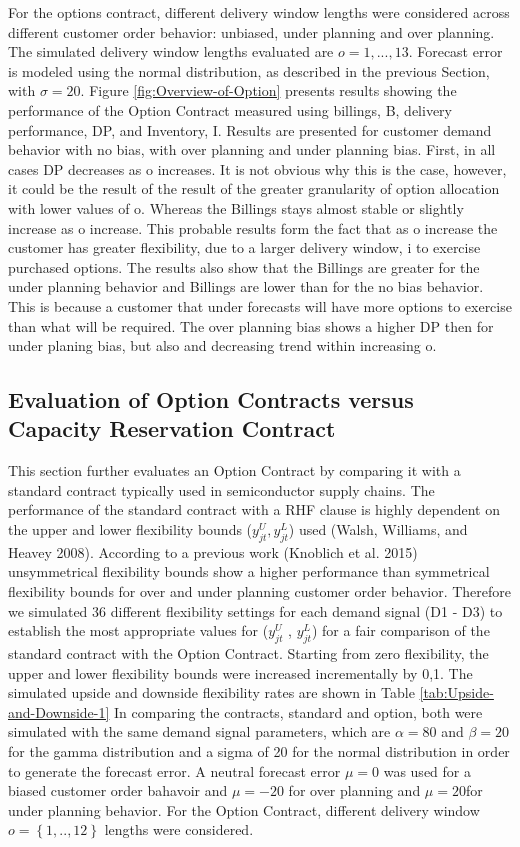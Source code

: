 \documentclass[12pt,english]{article}
\begin{document}
For the options contract, different delivery window
lengths were considered across different customer order behavior:
unbiased, under planning and over planning. The simulated delivery
window lengths evaluated are $o={1,...,13}$. Forecast error is modeled
using the normal distribution, as described in the previous Section,
with $\sigma=20.$ Figure \ref{fig:Overview-of-Option} presents
results showing the performance of the Option Contract measured using
billings, B, delivery performance, DP, and Inventory, I. Results are
presented for customer demand behavior with no bias, with over planning
and under planning bias. First, in all cases DP decreases as o increases.
It is not obvious why this is the case, however, it could be the result
of the result of the greater granularity of option allocation with
lower values of o. Whereas the Billings stays almost stable or slightly
increase as o increase. This probable results form the fact that as
o increase the customer has greater flexibility, due to a larger delivery
window, i to exercise purchased options. The results also show that
the Billings are greater for the under planning behavior and Billings
are lower than for the no bias behavior. This is because a customer
that under forecasts will have more options to exercise than what
will be required. The over planning bias shows a higher DP then for
under planing bias, but also and decreasing trend within increasing
o.

\subsection{Evaluation of Option Contracts versus Capacity
Reservation Contract}

This section further evaluates an Option Contract
by comparing it with a standard contract typically used in semiconductor
supply chains. The performance of the standard contract with a RHF
clause is highly dependent on the upper and lower flexibility bounds
($y_{jt}^{U},y_{jt}^{L}$) used (Walsh, Williams, and Heavey 2008).
According to a previous work (Knoblich et al. 2015) unsymmetrical
flexibility bounds show a higher performance than symmetrical flexibility
bounds for over and under planning customer order behavior. Therefore
we simulated 36 different flexibility settings for each demand signal
(D1 - D3) to establish the most appropriate values
for ($y_{jt}^{U}$ , $y_{jt}^{L}$) for a fair comparison of the standard
contract with the Option Contract. Starting from zero flexibility,
the upper and lower flexibility bounds were increased incrementally
by 0,1. The simulated upside and downside flexibility rates are shown
in Table \ref{tab:Upside-and-Downside-1} In comparing
the contracts, standard and option, both were simulated with the same
demand signal parameters, which are $\alpha=80$ and $\beta=20$ for
the gamma distribution and a sigma of 20 for the normal distribution
in order to generate the forecast error. A neutral forecast error
$\mu=0$ was used for a biased customer order bahavoir and $\mu=-20$
for over planning and $\mu=20$for under planning behavior. For the
Option Contract, different delivery window $o=\left\{ 1,..,12\right\} $
lengths were considered. 
\end{document}
